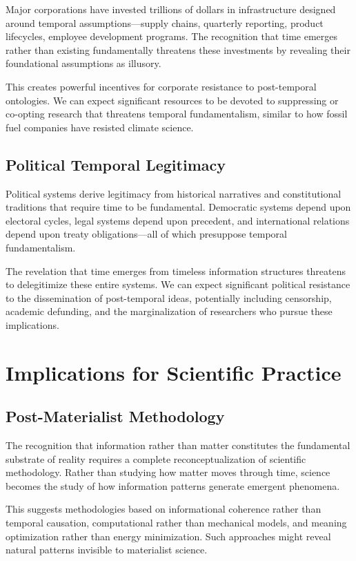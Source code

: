 \documentclass[12pt]{article}
\begin{document}
Major corporations have invested trillions of dollars in infrastructure designed around temporal assumptions—supply chains, quarterly reporting, product lifecycles, employee development programs. The recognition that time emerges rather than existing fundamentally threatens these investments by revealing their foundational assumptions as illusory.

This creates powerful incentives for corporate resistance to post-temporal ontologies. We can expect significant resources to be devoted to suppressing or co-opting research that threatens temporal fundamentalism, similar to how fossil fuel companies have resisted climate science.

\subsection{Political Temporal Legitimacy}

Political systems derive legitimacy from historical narratives and constitutional traditions that require time to be fundamental. Democratic systems depend upon electoral cycles, legal systems depend upon precedent, and international relations depend upon treaty obligations—all of which presuppose temporal fundamentalism.

The revelation that time emerges from timeless information structures threatens to delegitimize these entire systems. We can expect significant political resistance to the dissemination of post-temporal ideas, potentially including censorship, academic defunding, and the marginalization of researchers who pursue these implications.

\section{Implications for Scientific Practice}

\subsection{Post-Materialist Methodology}

The recognition that information rather than matter constitutes the fundamental substrate of reality requires a complete reconceptualization of scientific methodology. Rather than studying how matter moves through time, science becomes the study of how information patterns generate emergent phenomena.

This suggests methodologies based on informational coherence rather than temporal causation, computational rather than mechanical models, and meaning optimization rather than energy minimization. Such approaches might reveal natural patterns invisible to materialist science.
\end{document}
